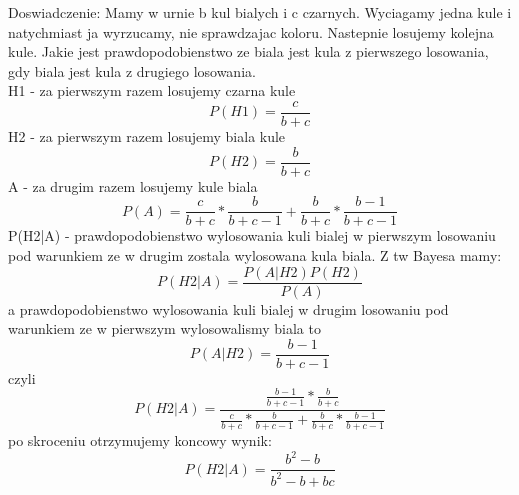 \medskip
{} 
\medskip

Doswiadczenie: Mamy w urnie b kul bialych i c czarnych. Wyciagamy jedna kule i natychmiast ja wyrzucamy, nie sprawdzajac koloru. Nastepnie losujemy kolejna kule. Jakie jest prawdopodobienstwo ze biala jest kula z pierwszego losowania, gdy biala jest kula z drugiego losowania.  
$$
$$
H1 - za pierwszym razem losujemy czarna kule
$$
P(H1) = \frac{c}{b+c}
$$
H2 - za pierwszym razem losujemy biala kule
$$
P(H2) = \frac{b}{b+c}
$$
A -  za drugim razem losujemy kule biala
$$
P(A) = \frac{c}{b+c}*\frac{b}{b+c-1} + \frac{b}{b+c}*\frac{b-1}{b+c-1}
$$
P(H2|A) - prawdopodobienstwo wylosowania kuli bialej w pierwszym losowaniu pod warunkiem ze w drugim zostala wylosowana kula biala.
Z tw Bayesa mamy:
$$
P(H2|A) = \frac{P(A|H2)P(H2)}{P(A)}
$$
a prawdopodobienstwo wylosowania kuli bialej w drugim losowaniu pod warunkiem ze w pierwszym wylosowalismy biala to
$$
P(A|H2) = \frac{b-1}{b+c-1}
$$
czyli
$$
P(H2|A) = \frac{ \frac{b-1}{b+c-1} * \frac{b}{b+c} }{ \frac{c}{b+c}*\frac{b}{b+c-1} + \frac{b}{b+c}*\frac{b-1}{b+c-1} }
$$
po skroceniu otrzymujemy koncowy wynik:
$$
P(H2|A) =\frac{ b^{2} - b} {b^{2} - b + bc}
$$  



